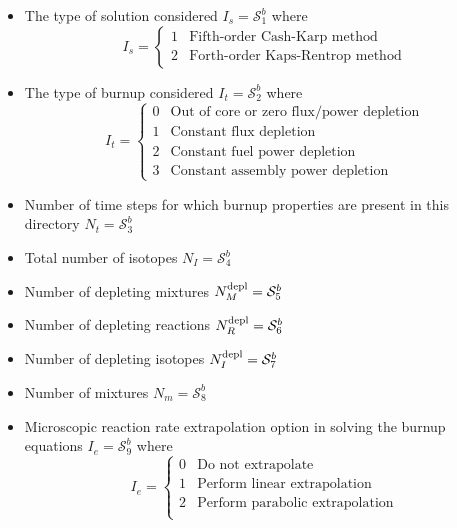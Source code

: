 \begin{itemize}
\item The type of solution considered $I_{s}=\mathcal{S}^{b}_{1}$ where
\vskip -0.8cm
\begin{displaymath}
I_{s} = \left\{
\begin{array}{rl}
 1 & \textrm{Fifth-order Cash-Karp method}\\
 2 & \textrm{Forth-order Kaps-Rentrop method}  
\end{array} \right.
\end{displaymath}

\item The type of burnup considered $I_{t}=\mathcal{S}^{b}_{2}$ where
\vskip -0.8cm
\begin{displaymath}
I_{t} = \left\{
\begin{array}{rl}
 0 & \textrm{Out of core or zero flux/power depletion} \\
 1 & \textrm{Constant flux depletion} \\
 2 & \textrm{Constant fuel power depletion} \\
 3 & \textrm{Constant assembly power depletion} 
\end{array} \right.
\end{displaymath}

\item Number of time steps for which burnup properties are present in this directory
$N_{t}=\mathcal{S}^{b}_{3}$
 
\item Total number of isotopes $N_{I}=\mathcal{S}^{b}_{4}$ 

\item Number of depleting mixtures $N^{\rm depl}_{M}=\mathcal{S}^{b}_{5}$

\item Number of depleting reactions $N^{\rm depl}_{R}=\mathcal{S}^{b}_{6}$

\item Number of depleting isotopes $N^{\rm depl}_{I}=\mathcal{S}^{b}_{7}$

\item Number of mixtures $N_m=\mathcal{S}^{b}_{8}$

\item Microscopic reaction rate extrapolation option in solving the burnup equations
$I_{e}=\mathcal{S}^{b}_{9}$ where
\vskip -0.8cm
\begin{displaymath}
I_{e} = \left\{
\begin{array}{rl}
 0 & \textrm{Do not extrapolate} \\
 1 & \textrm{Perform linear extrapolation} \\
 2 & \textrm{Perform parabolic extrapolation} \\
\end{array} \right.
\end{displaymath}


\end{itemize}
